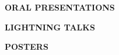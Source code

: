 \documentclass[twoside]{article}
\begin{document}
\newpage

\begin{center}
\Large{\textbf{ORAL PRESENTATIONS}}
\end{center}

\begin{multicols*}{2}

\end{multicols*}

\newpage

\begin{center}
\Large{\textbf{LIGHTNING TALKS}}
\end{center}

\begin{multicols*}{2}

\end{multicols*}


\newpage

\begin{center}
\Large{\textbf{POSTERS}}
\end{center}

\begin{multicols*}{2}

\end{multicols*}
\end{document}
